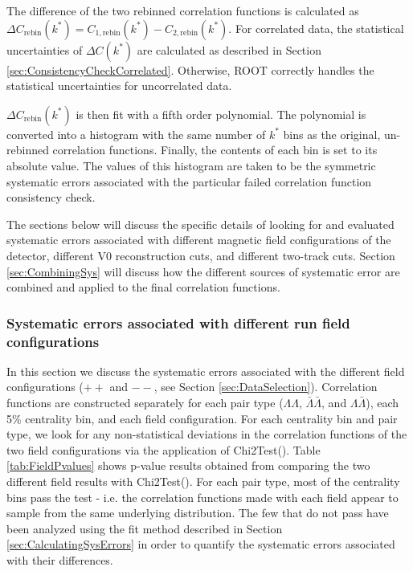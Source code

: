 The difference of the two rebinned correlation functions is calculated as $\Delta C_{\mathrm{rebin}}(k^*) = C_{1,\mathrm{rebin}}(k^*) - C_{2,\mathrm{rebin}}(k^*)$.  
For correlated data, the statistical uncertainties of $\Delta C(k^*)$ are calculated as described in Section \ref{sec:ConsistencyCheckCorrelated}.  
Otherwise, ROOT correctly handles the statistical uncertainties for uncorrelated data.

$\Delta C_{\mathrm{rebin}}(k^*)$ is then fit with a fifth order polynomial.  
The polynomial is converted into a histogram with the same number of $k^*$ bins as the original, un-rebinned correlation functions.  
Finally, the contents of each bin is set to its absolute value.  
The values of this histogram are taken to be the symmetric systematic errors associated with the particular failed correlation function consistency check.

The sections below will discuss the specific details of looking for and evaluated systematic errors associated with different magnetic field configurations of the detector, different V0 reconstruction cuts, and different two-track cuts. 
Section \ref{sec:CombiningSys} will discuss how the different sources of systematic error are combined and applied to the final correlation functions.

\subsubsection{Systematic errors associated with different run field configurations}
\label{sec:SystematicsFieldConfig}

In this section we discuss the systematic errors associated with the different field configurations ($++$ and $--$, see Section \ref{sec:DataSelection}).  
Correlation functions are constructed separately for each pair type ($\Lambda\Lambda$, $\bar{\Lambda}\bar{\Lambda}$, and $\Lambda\bar{\Lambda}$), each 5\% centrality bin, and each field configuration.  
For each centrality bin and pair type, we look for any non-statistical deviations in the correlation functions of the two field configurations via the application of Chi2Test().  
Table \ref{tab:FieldPvalues} shows p-value results obtained from comparing the two different field results with Chi2Test().  
For each pair type, most of the centrality bins pass the test - i.e. the correlation functions made with each field appear to sample from the same underlying distribution.  
The few that do not pass have been analyzed using the fit method described in Section \ref{sec:CalculatingSysErrors} in order to quantify the systematic errors associated with their differences.  

